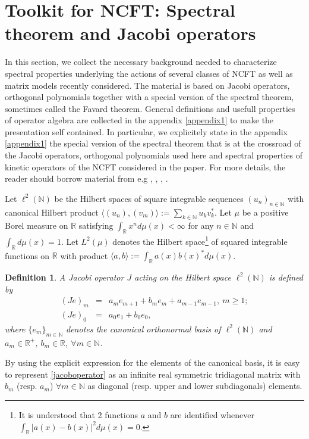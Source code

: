 \documentclass[a4paper,11pt,twoside]{article}
\numberwithin{equation}{section}
\newtheorem{definition}[Theorem]{Definition}
\theoremstyle{nonumberplain}
\newcounter{and}
\begin{document}
\section{Toolkit for NCFT: Spectral theorem and Jacobi operators}\label{subsection21}
In this section, we collect the necessary background needed to characterize spectral properties underlying the actions of several classes of NCFT as well as matrix models recently considered. The material is based on Jacobi operators, orthogonal polynomials together with a special version of the spectral theorem, sometimes called the Favard theorem. General definitions and usefull properties of operator algebra are collected in the appendix \ref{appendix1} to make the presentation self contained. In particular, we explicitely state in the appendix \ref{appendix1} the special version of the spectral theorem that is at the crossroad of the Jacobi operators, orthogonal polynomials used here and spectral properties of kinetic operators of the NCFT considered in the paper. For more details, the reader should borrow material from e.g \cite{akhiez:1965}, \cite{Gszego}, \cite{bsimon}, \cite{teschl}.\par
Let $\ell^2(\mathbb{N})$ be the Hilbert spaces of square integrable sequences $(u_n)_{n\in\mathbb{N}}$ with canonical Hilbert product $\langle (u_n),(v_m)\rangle:=\sum_{k\in\mathbb{N}}u_kv_k^*$. Let $\mu$ be a positive Borel measure on $\mathbb{R}$ satisfying $\int_\mathbb{R} x^nd\mu(x)<\infty$ for any $n\in\mathbb{N}$ and $\int_\mathbb{R} d\mu(x)=1$. Let $L^2(\mu)$ denotes the Hilbert space{\footnote{It is understood that 2 functions $a$ and $b$ are identified whenever $\int_\mathbb{R}\vert a(x)-b(x) \vert^2d\mu(x)=0$.}} of squared integrable functions on $\mathbb{R}$ with product $\langle a,b\rangle:=\int_\mathbb{R}a(x)b(x)^*d\mu(x)$. 
\begin{definition}\label{defin-jacobi}
A Jacobi operator $J$ acting on the Hilbert space $\ell^2(\mathbb{N})$ is defined by
\begin{eqnarray}
(Je)_m&=&a_me_{m+1}+b_me_m+a_{m-1}e_{m-1},\ m\ge1;\nonumber\\ 
(Je)_0&=&a_0e_1+b_0e_0 \label{jacoboperator},
\end{eqnarray}
where $\{e_m\}_{m\in\mathbb{N}}$ denotes the canonical orthonormal basis of $\ell^2(\mathbb{N})$ and $a_m\in\mathbb{R}^+$, $b_m\in\mathbb{R}$, $\forall m\in\mathbb{N}$.
\end{definition}
By using the explicit expression for the elements of the canonical basis, it is easy to represent \eqref{jacoboperator} as an infinite real symmetric tridiagonal matrix with $b_m$ (resp. $a_m$) $\forall m\in\mathbb{N}$ as diagonal (resp. upper and lower subdiagonals) elements. \par 
\end{document}
